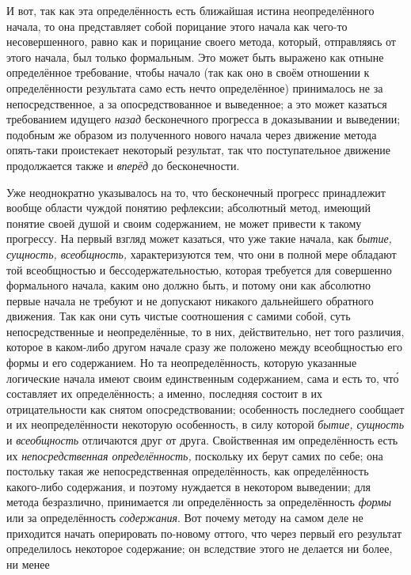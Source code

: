 И вот, так как эта определённость есть ближайшая истина
неопределённого начала, то она представляет собой порицание этого начала
как чего-то несовершенного, равно как и порицание своего метода, который,
отправляясь от этого начала, был только формальным. Это может быть выражено
как отныне определённое требование, чтобы начало (так как оно в своём
отношении к определённости результата само есть нечто определённое)
принималось не за непосредственное, а за опосредствованное и
выведенное; а это может казаться требованием идущего
{\em назад} бесконечного
прогресса в доказывании и выведении; подобным же образом из полученного
нового начала через движение метода опять-таки проистекает некоторый
результат, так что поступательное движение продолжается также и
{\em вперёд} до бесконечности.

Уже неоднократно указывалось на то, что бесконечный прогресс
принадлежит вообще области чуждой понятию рефлексии; абсолютный метод,
имеющий понятие своей душой и своим содержанием, не может привести к такому
прогрессу. На первый взгляд может казаться, что уже такие начала, как
{\em бытие, сущность, всеобщность,}
характеризуются тем, что они в полной мере обладают той
всеобщностью и бессодержательностью, которая требуется для совершенно
формального начала, каким оно должно быть, и потому они как абсолютно
первые начала не требуют и не допускают никакого дальнейшего обратного
движения. Так как они суть чистые соотношения с самими собой, суть
непосредственные и неопределённые, то в них, действительно, нет того
различия, которое в каком-либо другом начале сразу же положено между
всеобщностью его формы и его содержанием. Но та неопределённость, которую
указанные логические начала имеют своим единственным содержанием, сама и
есть то, чт\'{о} составляет их определённость; а именно, последняя состоит в их
отрицательности как снятом опосредствовании; особенность последнего
сообщает и их неопределённости некоторую особенность, в силу которой
{\em бытие, сущность} и {\em всеобщность}
отличаются друг от друга. Свойственная им определённость есть
их {\em непосредственная
определённость,} поскольку их берут самих по себе; она
постольку такая же непосредственная определённость, как определённость
какого-либо содержания, и поэтому нуждается в некотором выведении; для
метода безразлично, принимается ли определённость за определённость
{\em формы} или за определённость {\em содержания}.
Вот почему методу на самом деле не приходится начать
оперировать по-новому оттого, что через первый его результат определилось
некоторое содержание; он вследствие этого не делается ни более, ни менее
